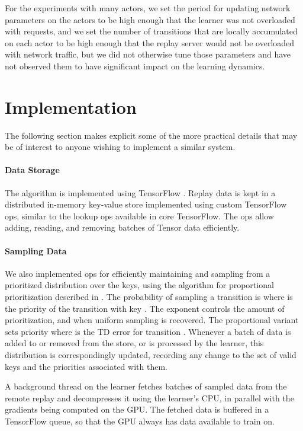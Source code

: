 \documentclass{article} \PassOptionsToPackage{usenames,dvipsnames}{xcolor}
\begin{document}
For the experiments with many actors, we set the period for updating network parameters on the actors to be high enough that the learner was not overloaded with requests, and we set the number of transitions that are locally accumulated on each actor to be high enough that the replay server would not be overloaded with network traffic, but we did not otherwise tune those parameters and have not observed them to have significant impact on the learning dynamics.

\section{Implementation}
\label{sec:app_implementation}

The following section makes explicit some of the more practical details that may be of interest to anyone wishing to implement a similar system.

\paragraph{Data Storage}

The algorithm is implemented using TensorFlow \citep{tensorflow}.  Replay data is kept in a distributed in-memory key-value store implemented using custom TensorFlow ops, similar to the lookup ops available in core TensorFlow. The ops allow adding, reading, and removing batches of Tensor data efficiently.

\paragraph{Sampling Data}

We also implemented ops for efficiently maintaining and sampling from a prioritized distribution over the keys, using the algorithm for proportional prioritization described in \cite{prioritized-replay}. The probability of sampling a transition is  where  is the priority of the transition with key . The exponent  controls the amount of prioritization, and when  uniform sampling is recovered. The proportional variant sets priority  where  is the TD error for transition . Whenever a batch of data is added to or removed from the store, or is processed by the learner, this distribution is correspondingly updated, recording any change to the set of valid keys and the priorities associated with them. 

A background thread on the learner fetches batches of sampled data from the remote replay and decompresses it using the learner's CPU, in parallel with the gradients being computed on the GPU. The fetched data is buffered in a TensorFlow queue, so that the GPU always has data available to train on.
\end{document}
